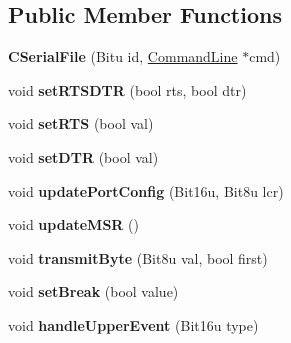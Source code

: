 \subsection*{Public Member Functions}
\begin{DoxyCompactItemize}
\item 
\hypertarget{classCSerialFile_a69e3b9018760526b1959cbc5888b2384}{{\bfseries C\-Serial\-File} (Bitu id, \hyperlink{classCommandLine}{Command\-Line} $\ast$cmd)}\label{classCSerialFile_a69e3b9018760526b1959cbc5888b2384}

\item 
\hypertarget{classCSerialFile_a0332d617eac1b859e675521b45368cd6}{void {\bfseries set\-R\-T\-S\-D\-T\-R} (bool rts, bool dtr)}\label{classCSerialFile_a0332d617eac1b859e675521b45368cd6}

\item 
\hypertarget{classCSerialFile_ad8a1e46f362cecc06ccbab9b277a9c9a}{void {\bfseries set\-R\-T\-S} (bool val)}\label{classCSerialFile_ad8a1e46f362cecc06ccbab9b277a9c9a}

\item 
\hypertarget{classCSerialFile_a8d1de2d3de29daaa580aef41ec425817}{void {\bfseries set\-D\-T\-R} (bool val)}\label{classCSerialFile_a8d1de2d3de29daaa580aef41ec425817}

\item 
\hypertarget{classCSerialFile_a8193f9a9279ec8f92c01a7ab21ebe691}{void {\bfseries update\-Port\-Config} (Bit16u, Bit8u lcr)}\label{classCSerialFile_a8193f9a9279ec8f92c01a7ab21ebe691}

\item 
\hypertarget{classCSerialFile_ace7d7b9e10423a6659abcb36b0baa40c}{void {\bfseries update\-M\-S\-R} ()}\label{classCSerialFile_ace7d7b9e10423a6659abcb36b0baa40c}

\item 
\hypertarget{classCSerialFile_afaf8fe35c1259d285df40eceaae33607}{void {\bfseries transmit\-Byte} (Bit8u val, bool first)}\label{classCSerialFile_afaf8fe35c1259d285df40eceaae33607}

\item 
\hypertarget{classCSerialFile_a1d836e0451c6cedbf0d5cd1a2f748d59}{void {\bfseries set\-Break} (bool value)}\label{classCSerialFile_a1d836e0451c6cedbf0d5cd1a2f748d59}

\item 
\hypertarget{classCSerialFile_a5756632760a38a3165519cb956d0a9b6}{void {\bfseries handle\-Upper\-Event} (Bit16u type)}\label{classCSerialFile_a5756632760a38a3165519cb956d0a9b6}

\end{DoxyCompactItemize}
